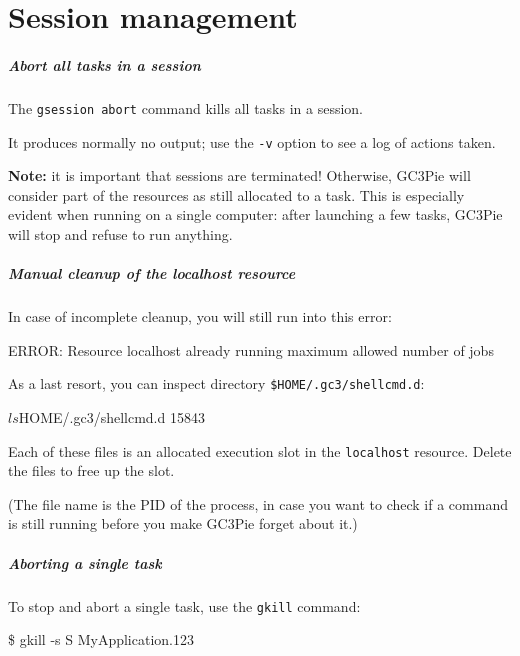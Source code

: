 \documentclass[english,serif,mathserif,xcolor=pdftex,dvipsnames,table]{beamer}
\begin{document}
\part{Session management}

\begin{frame}[fragile]
  \frametitle{Abort all tasks in a session}

  The \texttt{gsession abort} command kills all tasks in a session.

  \+
  It produces normally no output; use the \texttt{-v} option to see a
  log of actions taken.

  \+ \small \alert{\textbf{Note:} it is important that sessions are
  terminated!}  Otherwise, GC3Pie will consider part of the resources
  as still allocated to a task.  This is especially evident when
  running on a single computer: after launching a few tasks, GC3Pie
  will stop and refuse to run anything.
\end{frame}


\begin{frame}[fragile]
  \frametitle{Manual cleanup of the {\ttfamily localhost} resource}

  In case of incomplete cleanup, you will still run into this error:
\begin{stdout}
  ERROR: Resource localhost already running maximum allowed number of jobs
\end{stdout}

  \+
  As a last resort, you can inspect directory \lstinline|$HOME/.gc3/shellcmd.d|:
\begin{stdout}
  $ ls $HOME/.gc3/shellcmd.d
  15843
\end{stdout}
  Each of these files is an allocated execution slot in the \texttt{localhost} resource.
  Delete the files to free up the slot.

  \+ (The file name is the PID of the process, in case you want to
  check if a command is still running before you make GC3Pie forget
  about it.)
\end{frame}


\begin{frame}
  \frametitle{Aborting a single task}

  To stop and abort a single task, use the \texttt{gkill} command:
\begin{semiverbatim}
    \$ gkill -s S MyApplication.123
\end{semiverbatim}

\end{frame}
\end{document}
